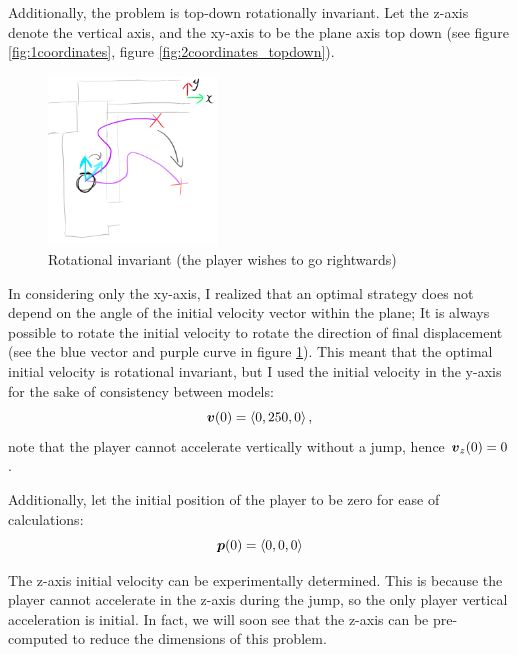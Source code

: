 Additionally, the problem is top-down rotationally invariant. Let the z-axis denote the vertical axis, and the xy-axis to be the plane axis top down (see figure \ref{fig:1coordinates}, figure \ref{fig:2coordinates_topdown}).

\begin{figure}[H]
    \centering
    \includegraphics[width=0.4\textwidth]{assets/2turning.png}
    \caption{Rotational invariant (the player wishes to go rightwards)}
    \label{fig:2turning}
\end{figure}

In considering only the xy-axis, I realized that an optimal strategy does not depend on the angle of the initial velocity vector within the plane; It is always possible to rotate the initial velocity to rotate the direction of final displacement (see the blue vector and purple curve in figure \ref{fig:2turning}). This meant that the optimal initial velocity is rotational invariant, but I used the initial velocity in the y-axis for the sake of consistency between models:
\[
    \boldsymbol{v}(0) = \left\langle 0, 250, 0 \right\rangle,
\]
note that the player cannot accelerate vertically without a jump, hence $\boldsymbol{v}_z(0) = 0$.

Additionally, let the initial position of the player to be zero for ease of calculations:
\[
    \boldsymbol{p}(0) = \left\langle 0, 0, 0 \right\rangle
\]

The z-axis initial velocity can be experimentally determined. This is because the player cannot accelerate in the z-axis during the jump, so the only player vertical acceleration is initial. In fact, we will soon see that the z-axis can be pre-computed to reduce the dimensions of this problem.

